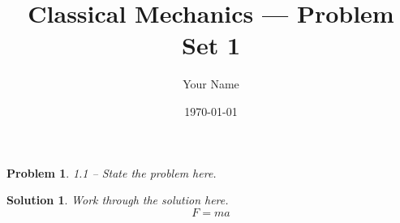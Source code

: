 \documentclass[11pt]{article}
\title{Classical Mechanics --- Problem Set 1}
\author{Your Name}
\date{\today}
\newtheorem*{problem}{Problem}
\newtheorem*{solution}{Solution}
\begin{document}
\maketitle

\begin{problem}
1.1 -- State the problem here.
\end{problem}

\begin{solution}
Work through the solution here.
\[
  F = ma
\]
\end{solution}
\end{document}
